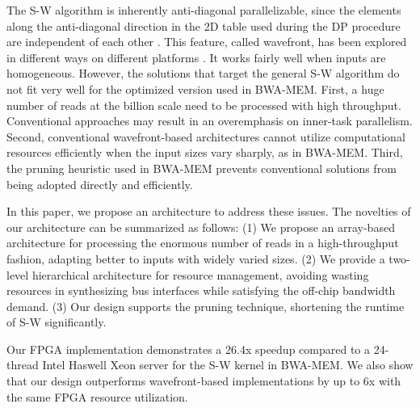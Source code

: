 The S-W algorithm is inherently anti-diagonal parallelizable, since the elements along the anti-diagonal direction in the 2D table used during the DP procedure are independent of each other \cite{Edmiston1988}. 
This feature, called wavefront, has been explored in different ways on different platforms \cite{Preusser2012}\cite{RaceLogic}\cite{Zhang2007}\cite{Lam2013}. 
It works fairly well when inputs are homogeneous. 
However, the solutions that target the general S-W algorithm do not fit very well for the optimized version used in BWA-MEM. 
First, a huge number of reads at the billion scale need to be processed with high throughput. 
Conventional approaches may result in an overemphasis on inner-task parallelism. 
Second, conventional wavefront-based architectures cannot utilize computational resources efficiently when the input sizes vary sharply, as in BWA-MEM. 
Third, the pruning heuristic used in BWA-MEM prevents conventional solutions from being adopted directly and efficiently.

In this paper, we propose an architecture to address these issues.
The novelties of our architecture can be summarized as follows: 
(1) We propose an array-based architecture for processing the enormous number of reads in a high-throughput fashion, adapting better to inputs with widely varied sizes. 
(2) We provide a two-level hierarchical architecture for resource management, avoiding wasting resources in synthesizing bus interfaces while satisfying the off-chip bandwidth demand.
(3) Our design supports the pruning technique, shortening the runtime of S-W significantly. 

Our FPGA implementation demonstrates a 26.4x speedup compared to a 24-thread Intel Haswell Xeon server for the S-W kernel in BWA-MEM. 
We also show that our design outperforms wavefront-based implementations by up to 6x with the same FPGA resource utilization.
